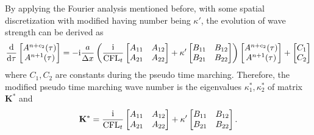 By applying the Fourier analysis mentioned before,
with some spatial  discretization with modified having number
being $\kappa'$, the evolution of wave strength can be derived as
\begin{equation}
    \label{eq:ode-stage-decouple-fourier}
    \derivative{ }{\tau}
    \begin{bmatrix}
        A^{n+c_2}(\tau) \\
        A^{n+1}(\tau)
    \end{bmatrix}
    =
    -\imagUnit \frac{a}{\inc x}
    \left(\frac{\imagUnit}{\CFLt}\begin{bmatrix}
        A_{11} & A_{12} \\
        A_{21} & A_{22} \\
    \end{bmatrix}
    +\kappa'
    \begin{bmatrix}
        B_{11} & B_{12} \\
        B_{21} & B_{22} \\
    \end{bmatrix}
    \right)
    \begin{bmatrix}
        A^{n+c_2}(\tau) \\
        A^{n+1}(\tau)
    \end{bmatrix}
    +
    \begin{bmatrix}
        C_1 \\C_2
    \end{bmatrix}
\end{equation}
where $C_1,C_2$ are constants during the pseudo time marching.
Therefore, the modified pseudo time marching wave number is
the eigenvalues $\kappa^*_1,\kappa^*_2$ of matrix $\mathbf{K}^*$ and
\begin{equation}
    \mathbf{K}^* = \frac{\mathrm{i}}{\text{CFL}_t}\begin{bmatrix}
        A_{11} & A_{12} \\
        A_{21} & A_{22} \\
    \end{bmatrix}
    +\kappa'
    \begin{bmatrix}
        B_{11} & B_{12} \\
        B_{21} & B_{22} \\
    \end{bmatrix}.
\end{equation}

